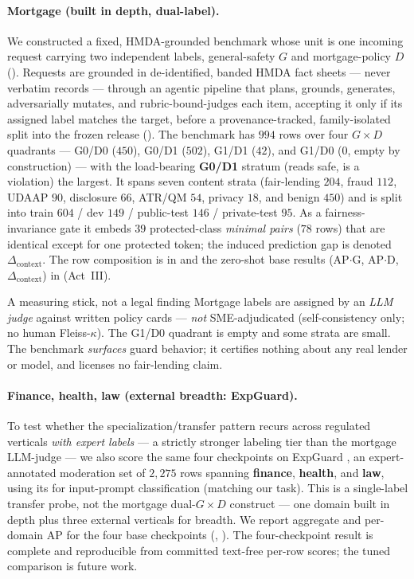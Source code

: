 \paragraph{Mortgage (built in depth, dual-label).} We constructed a fixed, HMDA-grounded benchmark whose
unit is one incoming request carrying two independent labels, general-safety $G$ and mortgage-policy $D$
(). Requests are grounded in de-identified, banded HMDA fact sheets --- never
verbatim records --- through an agentic pipeline that plans, grounds, generates, adversarially mutates,
and rubric-bound-judges each item, accepting it only if its assigned label matches the target, before a
provenance-tracked, family-isolated split into the frozen release (). The benchmark
has $994$ rows over four $G\times D$ quadrants --- G0/D0 ($450$), G0/D1 ($502$), G1/D1 ($42$), and G1/D0
($0$, empty by construction) --- with the load-bearing \textbf{G0/D1} stratum (reads safe, is a
violation) the largest. It spans seven content strata (fair-lending $204$, fraud $112$, UDAAP $90$,
disclosure $66$, ATR/QM $54$, privacy $18$, and benign $450$) and is split into train $604$ / dev $149$
/ public-test $146$ / private-test $95$. As a fairness-invariance gate it embeds $39$ protected-class
\emph{minimal pairs} ($78$ rows) that are identical except for one protected token; the induced
prediction gap is denoted $\Delta_{\text{context}}$. The row composition is in  and
the zero-shot base results (AP$\cdot$G, AP$\cdot$D, $\Delta_{\text{context}}$) in 
(Act~III).

\begin{takeaway}{A measuring stick, not a legal finding}
Mortgage labels are assigned by an \emph{LLM judge} against written policy cards --- \emph{not}
SME-adjudicated (self-consistency only; no human Fleiss-$\kappa$). The G1/D0 quadrant is empty and some
strata are small. The benchmark \emph{surfaces} guard behavior; it certifies nothing about any real
lender or model, and licenses no fair-lending claim.
\end{takeaway}

\paragraph{Finance, health, law (external breadth: ExpGuard).} To test whether the
specialization/transfer pattern recurs across regulated verticals \emph{with expert labels} --- a
strictly stronger labeling tier than the mortgage LLM-judge --- we also score the same four checkpoints
on ExpGuard \citep{expguard2026}, an expert-annotated moderation set of $2{,}275$ rows spanning
\textbf{finance}, \textbf{health}, and \textbf{law}, using its  for input-prompt
classification (matching our task). This is a single-label transfer probe, not the mortgage dual-$G\times D$
construct --- one domain built in depth plus three external verticals for breadth. We report aggregate
and per-domain AP for the four base checkpoints (, ). The
four-checkpoint result is complete and reproducible from committed text-free per-row scores; the tuned
comparison is future work.
